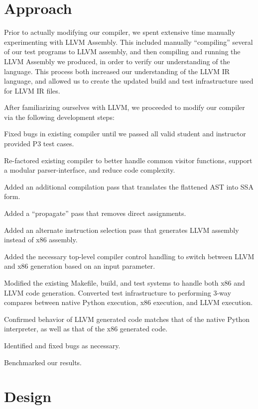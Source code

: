 \documentclass[11pt,twocolumn]{article}
\newenvironment{packed_enum}{
\begin{enumerate}
  \setlength{\itemsep}{1pt}
  \setlength{\parskip}{0pt}
  \setlength{\parsep}{0pt}
}{\end{enumerate}}
\begin{document}
\section{Approach}

Prior to actually modifying our compiler, we spent extensive time
manually experimenting with LLVM Assembly. This included manually
``compiling'' several of our test programs to LLVM assembly, and then
compiling and running the LLVM Assembly we produced, in order to
verify our understanding of the language. This process both increased
our understanding of the LLVM IR language, and allowed us to create
the updated build and test infrastructure used for LLVM IR files.

After familiarizing ourselves with LLVM, we proceeded to modify our
compiler via the following development steps:

\begin{packed_enum}
\item Fixed bugs in existing compiler until we passed all valid student
  and instructor provided P3 test cases.
\item Re-factored existing compiler to better handle common visitor
  functions, support a modular parser-interface, and reduce code
  complexity.
\item Added an additional compilation pass that translates the flattened
  AST into SSA form.
\item Added a ``propagate'' pass that removes direct assignments.
\item Added an alternate instruction selection pass that generates LLVM
  assembly instead of x86 assembly.
\item Added the necessary top-level compiler control handling to switch
  between LLVM and x86 generation based on an input parameter.
\item Modified the existing Makefile, build, and test systems to handle
  both x86 and LLVM code generation. Converted test infrastructure to
  performing 3-way compares between native Python execution, x86
  execution, and LLVM execution.
\item Confirmed behavior of LLVM generated code matches that of the
  native Python interpreter, as well as that of the x86 generated
  code.
\item Identified and fixed bugs as necessary.
\item Benchmarked our results.
\end{packed_enum}

\section{Design}
\label{sec:design}
\end{document}
